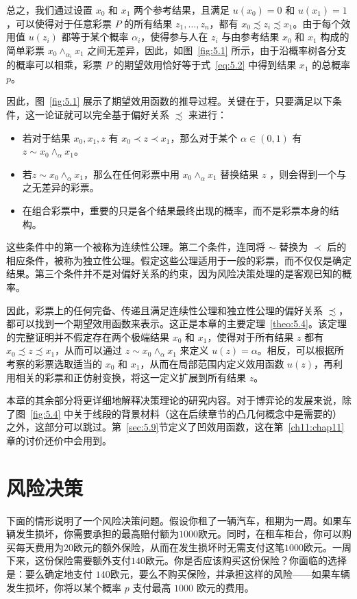 总之，我们通过设置 \(x_0\) 和 \(x_1\) 两个参考结果，且满足 \(u(x_0)=0\) 和 \(u(x_1)=1\)，可以使得对于任意彩票 \(P\) 的所有结果 \(z_1,\ldots,z_n\)，都有 \(x_0\precsim z_i\precsim x_1\)。由于每个效用值 \(u(z_i)\) 都等于某个概率 \(\alpha_i\)，使得参与人在 \(z_i\) 与由参考结果 \(x_0\) 和 \(x_1\) 构成的简单彩票 \(x_0\wedge_{\alpha_i}x_1\) 之间无差异，因此，如图~\ref{fig:5.1} 所示，由于沿概率树各分支的概率可以相乘，彩票 \(P\) 的期望效用恰好等于式~\eqref{eq:5.2} 中得到结果 \(x_1\) 的总概率 \(p\)。

因此，图~\ref{fig:5.1} 展示了期望效用函数的推导过程。关键在于，只要满足以下条件，这一论证就可以完全基于偏好关系 \(\precsim\) 来进行：
\begin{itemize}
\item 若对于结果 \({x}_{0},{x}_{1},z\) 有 \({x}_{0} \prec  z \prec  {x}_{1}\)，那么对于某个 \(\alpha  \in  \left( {0,1}\right)\) 有 \(z \sim  {x}_{0}{ \land  }_{\alpha }{x}_{1}\)。
\item 若\(z \sim  {x}_{0}{ \land  }_{\alpha }{x}_{1}\)，那么在任何彩票中用 \({x}_{0}{ \land  }_{\alpha }{x}_{1}\) 替换结果 \(z\) ，则会得到一个与之无差异的彩票。
\item 在组合彩票中，重要的只是各个结果最终出现的概率，而不是彩票本身的结构。
\end{itemize}
这些条件中的第一个被称为连续性公理。第二个条件，连同将 \(\sim\) 替换为 \( \prec \) 后的相应条件，被称为独立性公理。假定这些公理适用于一般的彩票，而不仅仅是确定结果。第三个条件并不是对偏好关系的约束，因为风险决策处理的是客观已知的概率。

因此，彩票上的任何完备、传递且满足连续性公理和独立性公理的偏好关系 \(\precsim\)，都可以找到一个期望效用函数来表示。这正是本章的主要定理~\ref{theo:5.4}。该定理的完整证明并不假定存在两个极端结果 \(x_0\) 和 \(x_1\)，使得对于所有结果 \(z\) 都有 \(x_0\precsim z\precsim x_1\)，从而可以通过 \(z\sim x_0\wedge_{\alpha}x_1\) 来定义 \(u(z)=\alpha\)。相反，可以根据所考察的彩票选取适当的 \(x_0\) 和 \(x_1\)，从而在局部范围内定义效用函数 \(u(z)\)，再利用相关的彩票和正仿射变换，将这一定义扩展到所有结果 \(z\)。

本章的其余部分将更详细地解释决策理论的研究内容。对于博弈论的发展来说，除了图~\ref{fig:5.4} 中关于线段的背景材料（这在后续章节的凸几何概念中是需要的）之外，这部分可以跳过。第~\ref{sec:5.9}节定义了凹效用函数，这在第~\ref{ch11:chap11}章的讨价还价中会用到。

\section{风险决策}\label{sec:5.3}
下面的情形说明了一个风险决策问题。假设你租了一辆汽车，租期为一周。如果车辆发生损坏，你需要承担的最高赔付额为$1000$欧元。同时，在租车柜台，你可以购买每天费用为$20$欧元的额外保险，从而在发生损坏时无需支付这笔$1000$欧元。一周下来，这份保险需要额外支付$140$欧元。你是否应该购买这份保险？你面临的选择是：要么确定地支付 $140 $欧元，要么不购买保险，并承担这样的风险——如果车辆发生损坏，你将以某个概率 \(p\) 支付最高 $1000$ 欧元的费用。

